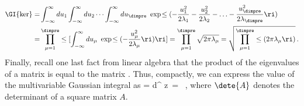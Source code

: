\begin{align}
\GI{\ker} =&\int_{-\infty}^{\infty} du_1\int_{-\infty}^{\infty} du_2\cdots \int_{-\infty}^{\infty} du_{\dimpre}\ \exp\!\le(-\frac{u_1^2}{2\lambda_1}-\frac{u_2^2}{2\lambda_2}-\ldots-\frac{u_\dimpre^2}{2\lambda_\dimpre}\ri)\, \\
=&\prod_{\mu=1}^{\dimpre}\le[ \int_{-\infty}^{\infty} du_{\mu}\ \exp\!\le(-\frac{u_{\mu}^2}{2\lambda_{\mu}}\ri)\ri]
=\prod_{\mu=1}^{\dimpre} \sqrt{2\pi \lambda_{\mu}}= \sqrt{\prod_{\mu=1}^{\dimpre}\le(2\pi \lambda_{\mu}\ri)}\, . \nonumber
\end{align}
Finally, recall one last fact from linear algebra that the product of the eigenvalues of a matrix is equal to the matrix . Thus, compactly, we can express the value of the multivariable Gaussian integral as
\be\label{eq:det_formula}
\GI{\ker} = \int d^\dimpre\! z\ \exp\!\le[-\frac{1}{2}\sum_{\mu,\nu=1}^{\dimpre} z_{\mu} (K^{-1})_{\mu\nu}z_{\nu}\ri]=  \, ,
\ee
where $\dete{A}$ denotes the determinant of a square matrix $A$.


